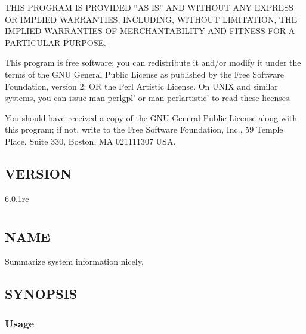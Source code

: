 \documentclass[letterpaper,10pt,english]{sphinxmanual}
\begin{document}
\sphinxAtStartPar
THIS PROGRAM IS PROVIDED “AS IS” AND WITHOUT ANY EXPRESS OR IMPLIED
WARRANTIES, INCLUDING, WITHOUT LIMITATION, THE IMPLIED WARRANTIES OF
MERCHANTABILITY AND FITNESS FOR A PARTICULAR PURPOSE.

\sphinxAtStartPar
This program is free software; you can redistribute it and/or modify it under
the terms of the GNU General Public License as published by the Free Software
Foundation, version 2; OR the Perl Artistic License.  On UNIX and similar
systems, you can issue \textasciigrave{}man perlgpl’ or \textasciigrave{}man perlartistic’ to read these
licenses.

\sphinxAtStartPar
You should have received a copy of the GNU General Public License along with
this program; if not, write to the Free Software Foundation, Inc., 59 Temple
Place, Suite 330, Boston, MA  02111\sphinxhyphen{}1307  USA.


\section{VERSION}
\label{\detokenize{mariadb-status-diff:version}}
\sphinxAtStartPar
{} 6.0.1rc


\chapter{}
\label{\detokenize{mariadb-summary:mariadb-summary}}\label{\detokenize{mariadb-summary::doc}}

\section{NAME}
\label{\detokenize{mariadb-summary:name}}
\sphinxAtStartPar
{} \sphinxhyphen{} Summarize system information nicely.


\section{SYNOPSIS}
\label{\detokenize{mariadb-summary:synopsis}}

\subsection{Usage}
\label{\detokenize{mariadb-summary:usage}}
\begin{sphinxVerbatim}[commandchars=\\\{\}]
\end{sphinxVerbatim}
\end{document}
